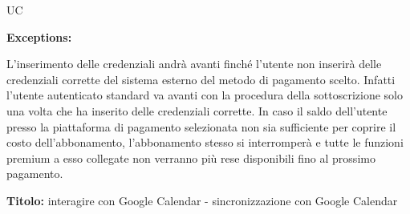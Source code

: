 \begin{listaPersonale}{UC}
\begin{listaPersonale2}[UC] {}
        \textbf{Exceptions:}
        \begin{enumerate}[label=\textbf{[exception \arabic{enumiii}]}, ref= \textbf{[exception \arabic{enumiii}]}]
             L'inserimento delle credenziali andrà avanti finché l'utente non inserirà delle credenziali corrette del sistema esterno del metodo di pagamento scelto. Infatti l'utente autenticato standard va avanti con la procedura della sottoscrizione solo una volta che ha inserito delle credenziali corrette.
             In caso il saldo dell'utente presso la piattaforma di pagamento selezionata non sia sufficiente per coprire il costo dell'abbonamento, l'abbonamento stesso si interromperà e tutte le funzioni premium a esso collegate non verranno più rese disponibili fino al prossimo pagamento.
        \end{enumerate}

        \begin{comment}
        \todo{Qua c'è un problema non possiamo mettere la sottoscrizione dalle impostazioni Account sennò dopo dobbiamo andare a modificare in realtà impostazioni account e il suo state diagram. Qua in realtà ne avevamo anche parlato con il prof che ha detto che va bene, andiamo a specificare che questo use case è una specifica di impostazioni account.}
        \end{comment}


        \newpage

        \begin{center}
            
        \end{center}

        \begin{listaPersonale3} [UC]{}
            \textbf{Titolo:} interagire con Google Calendar - sincronizzazione con Google Calendar\\


\end{listaPersonale3}
\end{listaPersonale2}
\end{listaPersonale}
